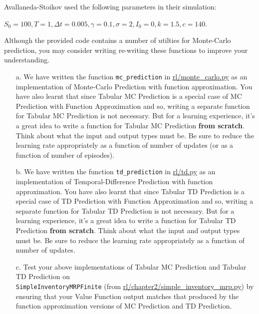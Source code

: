 \documentclass[12pt]{exam}
\begin{document}
\begin{questions}
Avallaneda-Stoikov used the following parameters in their simulation:

$S_0 = 100, T = 1, \Delta t = 0.005, \gamma = 0.1, \sigma = 2, I_0 = 0, k = 1.5, c = 140$.

\question Although the provided code contains a number of utilties for Monte-Carlo prediction, you may consider writing re-writing these functions to improve your understanding. 
\begin{enumerate}
	\item[a.] We have written the function \lstinline{mc_prediction} in \href{https://github.com/TikhonJelvis/RL-book/blob/master/rl/monte_carlo.py}{rl\//monte\_carlo.py} as an implementation of Monte-Carlo Prediction with function approximation. You have also learnt that since Tabular MC Prediction is a special case of MC Prediction with Function Approximation and so, writing a separate function for Tabular MC Prediction is not necessary. But for a learning experience, it's a great idea to write a function for Tabular MC Prediction {\bf from scratch}. Think about what the input and output types must be. Be sure to reduce the learning rate appropriately as a function of number of updates (or as a function of number of episodes).
	\item[b.] We have written the function \lstinline{td_prediction} in \href{https://github.com/TikhonJelvis/RL-book/blob/master/rl/td.py}{rl\//td.py} as an implementation of Temporal-Difference Prediction with function approximation. You have also learnt that since Tabular TD Prediction is a special case of TD Prediction with Function Approximation and so, writing a separate function for Tabular TD Prediction is not necessary. But for a learning experience, it's a great idea to write a function for Tabular TD Prediction {\bf from scratch}. Think about what the input and output types must be. Be sure to reduce the learning rate appropriately as a function of number of updates. 
	\item[c.] Test your above implementations of Tabular MC Prediction and Tabular TD Prediction on \\\lstinline{SimpleInventoryMRPFinite} (from \href{https://github.com/TikhonJelvis/RL-book/blob/master/rl/chapter2/simple_inventory_mrp.py}{rl\//chapter2\//simple\_inventory\_mrp.py}) by ensuring that your Value Function output matches that produced by the function approximation versions of MC Prediction and TD Prediction.
\end{enumerate}

\end{questions}
\end{document}
